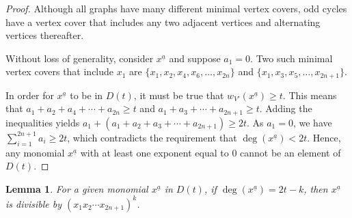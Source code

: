 \documentclass[12pt]{amsart}
\renewcommand{\geq}{\geqslant}
\theoremstyle{plain}
\newtheorem{lem}[theorem]{Lemma}
\theoremstyle{definition}
\begin{document}
\begin{proof}
Although all graphs have many different minimal vertex covers, odd cycles have a vertex cover that %
includes any two adjacent vertices and alternating vertices thereafter.

Without loss of generality, consider $x^{\underline{a}}$ and suppose $a_1=0$. Two such minimal vertex covers that include $x_1$ are $\{x_1, x_2, x_4, x_6, \ldots, x_{2n}\}$ and $\{x_1, x_3, x_5, \ldots, x_{2n+1}\}$.

In order for $x^{\underline{a}}$ to be in $D(t)$, it must be true that $w_{V'}(x^{\underline{a}}) \geq t$. This means that  $a_1 + a_2 +a_4 + \cdots + a_{2n} \geq t$ and $a_1 + a_3 + \cdots +a_{2n+1} \geq t$. Adding the inequalities yields $a_1 + (a_1 +a_2 +a_3 +\cdots + a_{2n+1}) \geq 2t$. As $a_1 = 0$, we have $\sum\limits_{i=1}^{2n+1} a_i \geq 2t$, which contradicts the requirement that $\deg(x^{\underline{a}}) < 2t$. %
Hence, any monomial $x^{\underline{a}}$ with at least one exponent equal to 0 cannot be an element of $D(t)$. %
\end{proof}


\begin{lem}\label{lem:levels}
For a given monomial $x^{\underline{a}}$ in $D(t)$, if $\deg(x^{\underline{a}}) = 2t - k$, then $x^{\underline{a}}$ is divisible by $(x_1 x_2 \cdots x_{2n+1})^k$.
\end{lem}
\end{document}
